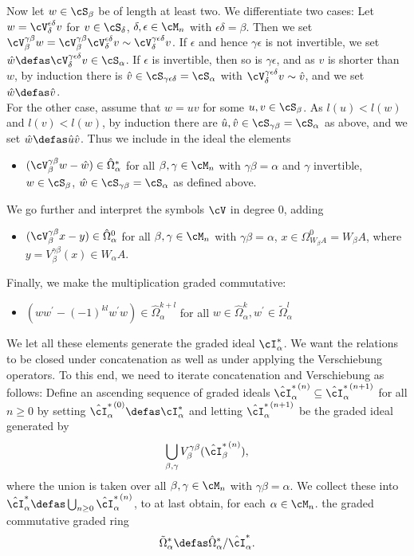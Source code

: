 Now let $w \in \cS_\beta$ be of length at least two. We differentiate two cases: Let %
$w = \cV_\delta^{\epsilon\delta} v$ for $v \in \cS_\delta$, $\delta, \epsilon \in \cM_n$ with $\epsilon\delta = \beta$. Then we set $ \cV_\beta^{\gamma\beta} w = %
  \cV_\beta^{\gamma\beta} \cV_\delta^{\epsilon\delta} v \sim %
  \cV_\delta^{\gamma\epsilon\delta} v$. %
If $\epsilon$ and hence $\gamma\epsilon$ is not invertible, we set $\hat w \defas \cV_\delta^{\gamma\epsilon\delta} v \in \cS_{\alpha}$. If $\epsilon$ is invertible, then so is $\gamma\epsilon$, and as $v$ is shorter than $w$, by induction there is $\hat v \in \cS_{\gamma\epsilon\delta} = \cS_{\alpha}$ with $\cV_\delta^{\gamma\epsilon\delta} v \sim \hat v$, and we set $\hat w \defas \hat v$.\\
For the other case, assume that $w = uv$ for some $u,v \in \cS_\beta$. As $l(u) < l(w)$ and $l(v) < l(w)$, by induction there are $\hat u, \hat v \in \cS_{\gamma\beta} = \cS_\alpha$ as above, and we set $\hat w \defas \hat u \hat v$. Thus we include in the ideal the elements
\begin{itemize}
\item $(\cV_\beta^{\gamma\beta} w - \hat w ) \in \hat \Omega^*_{\alpha}$ for all %
  $\beta, \gamma \in \cM_n$ with $\gamma\beta = \alpha$ and $\gamma$ invertible, $w \in \cS_\beta$, $\hat w \in \cS_{\gamma\beta} = \cS_\alpha$ as defined above.
\end{itemize}
We go further and interpret the symbols $\cV$ in degree $0$, adding
\begin{itemize}
\item $(\cV_\beta^{\gamma\beta} x - y) \in \hat \Omega^0_{\alpha}$ for all %
  $\beta, \gamma \in \cM_n$ with $\gamma\beta= \alpha$, $x \in \Omega^0_{W_\beta A} = W_\beta A$, %
  where $y = V_\beta^{\gamma\beta} (x) \in W_{\alpha} A$.
\end{itemize}
Finally, we make the multiplication graded commutative:
\begin{itemize}
\item $(w w^\prime - (-1)^{kl} w^\prime w) \in \hat\Omega^{k+l}_\alpha$ for all $w \in \hat\Omega^k_\alpha, w^\prime \in \tilde\Omega^l_\alpha$
\end{itemize}
We let all these elements generate the graded ideal $\cI_\alpha^*$. We want the relations to be closed under concatenation as well as under applying the Verschiebung operators. To this end, we need to iterate concatenation and Verschiebung as follows: Define an ascending sequence of graded ideals $\hat\cI_\alpha^{*\,(n)} \subseteq \hat\cI_\alpha^{*\,(n+1)}$ for all $n \geq 0$ by setting $\hat\cI_\alpha^{*\,(0)} \defas \cI_\alpha^*$ and letting $\hat\cI_\alpha^{*\,(n+1)}$ be the graded ideal generated by%
    \[\bigcup_{\beta,\gamma} V_\beta^{\gamma\beta}(\hat\cI_\beta^{*\,(n)}),\]%
where the union is taken over all $\beta,\gamma \in \cM_n$ with $\gamma\beta=\alpha$. We collect these into $\hat\cI_\alpha^{*} \defas \bigcup_{n \geq 0} \hat\cI_\alpha^{*\,(n)}$, to at last obtain, for each $\alpha \in \cM_n$. the graded commutative graded ring%
    \[\tilde\Omega_\alpha^* \defas \hat\Omega_\alpha^* / \hat\cI_\alpha^*.\]
